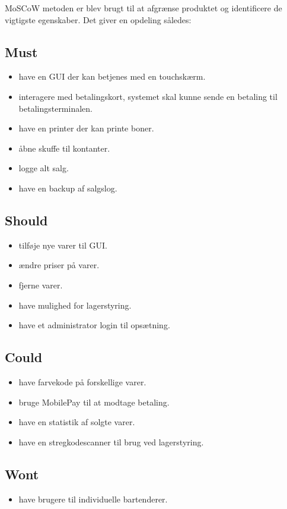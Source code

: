 MoSCoW metoden er blev brugt til at afgrænse produktet og identificere de vigtigste egenskaber. Det giver en opdeling således:

\subsection{Must}
\begin{itemize}
\item have en GUI der kan betjenes med en touchskærm.
\item interagere med betalingskort, systemet skal kunne sende en betaling til betalingsterminalen.
\item have en printer der kan printe boner.
\item åbne skuffe til kontanter.
\item logge alt salg.
\item have en backup af salgslog.
\end{itemize}

\subsection{Should}
\begin{itemize}
\item tilføje nye varer til GUI.
\item ændre priser på varer.
\item fjerne varer.
\item have mulighed for lagerstyring.
\item have et administrator login til opsætning.
\end{itemize}

\subsection{Could}
\begin{itemize}
\item have farvekode på forskellige varer.
\item bruge MobilePay til at modtage betaling.
\item have en statistik af solgte varer.
\item have en stregkodescanner til brug ved lagerstyring.
\end{itemize}

\subsection{Wont}
\begin{itemize}
\item have brugere til individuelle bartenderer.
\end{itemize}